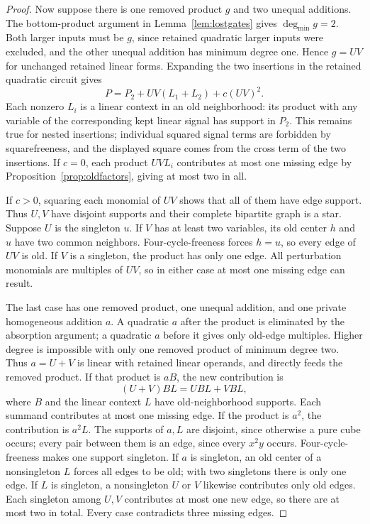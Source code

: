 \documentclass[11pt]{article}
\theoremstyle{definition}
\theoremstyle{remark}
\begin{document}
\begin{proof}
Now suppose there is one removed product $g$ and two unequal additions. The bottom-product argument in Lemma~\ref{lem:lostgates} gives $\deg_{\min}g=2$. Both larger inputs must be $g$, since retained quadratic larger inputs were excluded, and the other unequal addition has minimum degree one. Hence $g=UV$ for unchanged retained linear forms. Expanding the two insertions in the retained quadratic circuit gives
\[
 P=P_2+UV(L_1+L_2)+c(UV)^2.
\]
Each nonzero $L_i$ is a linear context in an old neighborhood: its product with any variable of the corresponding kept linear signal has support in $P_2$. This remains true for nested insertions; individual squared signal terms are forbidden by squarefreeness, and the displayed square comes from the cross term of the two insertions. If $c=0$, each product $UVL_i$ contributes at most one missing edge by Proposition~\ref{prop:oldfactors}, giving at most two in all.

If $c>0$, squaring each monomial of $UV$ shows that all of them have edge support. Thus $U,V$ have disjoint supports and their complete bipartite graph is a star. Suppose $U$ is the singleton $u$. If $V$ has at least two variables, its old center $h$ and $u$ have two common neighbors. Four-cycle-freeness forces $h=u$, so every edge of $UV$ is old. If $V$ is a singleton, the product has only one edge. All perturbation monomials are multiples of $UV$, so in either case at most one missing edge can result.

The last case has one removed product, one unequal addition, and one private homogeneous addition $a$. A quadratic $a$ after the product is eliminated by the absorption argument; a quadratic $a$ before it gives only old-edge multiples. Higher degree is impossible with only one removed product of minimum degree two. Thus $a=U+V$ is linear with retained linear operands, and directly feeds the removed product. If that product is $aB$, the new contribution is
\[
 (U+V)BL=UBL+VBL,
\]
where $B$ and the linear context $L$ have old-neighborhood supports. Each summand contributes at most one missing edge. If the product is $a^2$, the contribution is $a^2L$. The supports of $a,L$ are disjoint, since otherwise a pure cube occurs; every pair between them is an edge, since every $x^2y$ occurs. Four-cycle-freeness makes one support singleton. If $a$ is singleton, an old center of a nonsingleton $L$ forces all edges to be old; with two singletons there is only one edge. If $L$ is singleton, a nonsingleton $U$ or $V$ likewise contributes only old edges. Each singleton among $U,V$ contributes at most one new edge, so there are at most two in total. Every case contradicts three missing edges.
\end{proof}
\end{document}
